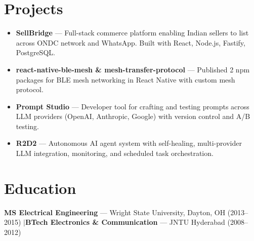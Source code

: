 \documentclass[letterpaper]{article}
\begin{document}
\section*{Projects}
\begin{itemize}
  \item \textbf{SellBridge} --- Full-stack commerce platform enabling Indian sellers to list across ONDC network and WhatsApp. Built with React, Node.js, Fastify, PostgreSQL.
  \item \textbf{react-native-ble-mesh \& mesh-transfer-protocol} --- Published 2 npm packages for BLE mesh networking in React Native with custom mesh protocol.
  \item \textbf{Prompt Studio} --- Developer tool for crafting and testing prompts across LLM providers (OpenAI, Anthropic, Google) with version control and A/B testing.
  \item \textbf{R2D2} --- Autonomous AI agent system with self-healing, multi-provider LLM integration, monitoring, and scheduled task orchestration.
\end{itemize}

\section*{Education}

\textbf{MS Electrical Engineering} --- Wright State University, Dayton, OH (2013--2015) \enspace$|$\enspace \textbf{BTech Electronics \& Communication} --- JNTU Hyderabad (2008--2012)
\end{document}
